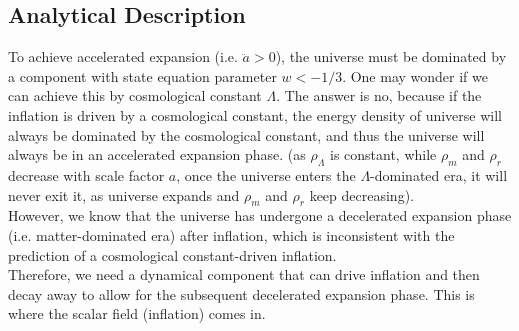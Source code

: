 \subsection{Analytical Description}
\begin{intuition}
    To achieve accelerated expansion (i.e. $\ddot{a} > 0$), the universe must be dominated by a component with state equation parameter $w < -1/3$. One may wonder if we can achieve this by cosmological constant $\Lambda$. The answer is no, because if the inflation is driven by a cosmological constant, the energy density of universe will always be dominated by the cosmological constant, and thus the universe will always be in an accelerated expansion phase. (as $\rho_\Lambda$ is constant, while $\rho_m$ and $\rho_r$ decrease with scale factor $a$, once the universe enters the $\Lambda$-dominated era, it will never exit it, as universe expands and $\rho_m$ and $\rho_r$ keep decreasing). \\
    
    However, we know that the universe has undergone a decelerated expansion phase (i.e. matter-dominated era) after inflation, which is inconsistent with the prediction of a cosmological constant-driven inflation. \\
    
    Therefore, we need a dynamical component that can drive inflation and then decay away to allow for the subsequent decelerated expansion phase. This is where the scalar field (inflation) comes in.
\end{intuition} 

